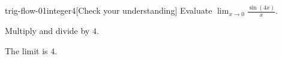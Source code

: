 \begin{bgcheck}{trig-flow-01}{integer}{4}[Check your understanding]
Evaluate \(\lim_{x\to0}\frac{\sin(4x)}x\).
\begin{bghint}
Multiply and divide by \(4\).
\end{bghint}
\begin{bgreveal}
The limit is \(4\).
\end{bgreveal}
\end{bgcheck}
